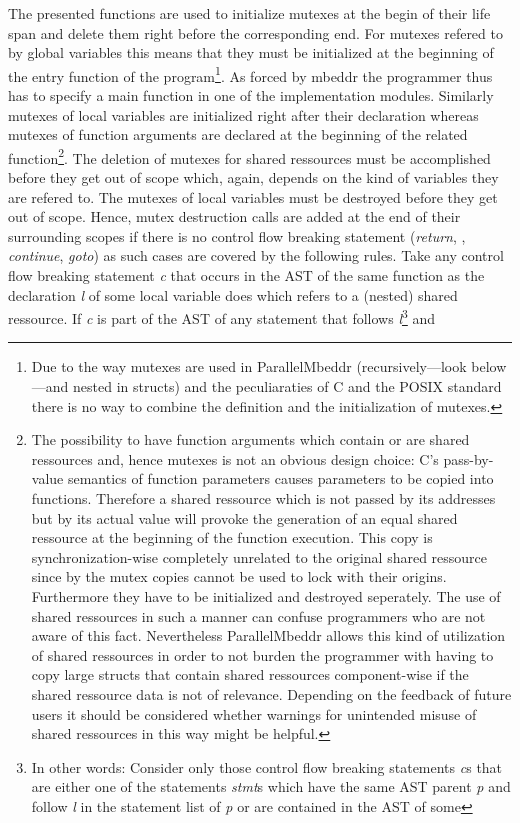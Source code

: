 The presented functions are used to initialize mutexes at the begin of their life span and delete them right before the corresponding end. For mutexes refered to by global variables this means that they must be initialized at the beginning of the entry function of the program\footnote{Due to the way mutexes are used in ParallelMbeddr (recursively---look below---and nested in structs) and the peculiaraties of C and the POSIX standard there is no way to combine the definition and the initialization of mutexes.}. As forced by mbeddr the programmer thus has to specify a main function in one of the implementation modules. Similarly mutexes of local variables are initialized right after their declaration whereas mutexes of function arguments are declared at the beginning of the related function\footnote{\label{mutexCopies}The possibility to have function arguments which contain or are shared ressources and, hence mutexes is not an obvious design choice: C's pass-by-value semantics of function parameters causes parameters to be copied into functions. Therefore a shared ressource which is not passed by its addresses but by its actual value will provoke the generation of an equal shared ressource at the beginning of the function execution. This copy is synchronization-wise completely unrelated to the original shared ressource since by the mutex copies cannot be used to lock with their origins\cite{Mutexes}. Furthermore they have to be initialized and destroyed seperately. The use of shared ressources in such a manner can confuse programmers who are not aware of this fact. Nevertheless ParallelMbeddr allows this kind of utilization of shared ressources in order to not burden the programmer with having to copy large structs that contain shared ressources component-wise if the shared ressource data is not of relevance. Depending on the feedback of future users it should be considered whether warnings for unintended misuse of shared ressources in this way might be helpful.}. The deletion of mutexes for shared ressources must be accomplished before they get out of scope which, again, depends on the kind of variables they are refered to. 
The mutexes of local variables must be destroyed before they get out of scope. Hence, mutex destruction calls are added at the end of their surrounding scopes if there is no control flow breaking statement (\textit{return}, , \textit{continue}, \textit{goto}) as such cases are covered by the following rules. Take any control flow breaking statement \textit{c} that occurs in the AST of the same function as the declaration \textit{l} of some local variable does which refers to a (nested) shared ressource. If \textit{c} is part of the AST of any statement that follows \textit{l}\footnote{In other words: Consider only those control flow breaking statements \textit{c}s that are either one of the statements \textit{stmt}s which have the same AST parent \textit{p} and follow \textit{l} in the statement list of \textit{p} or are contained in the AST of some } and
